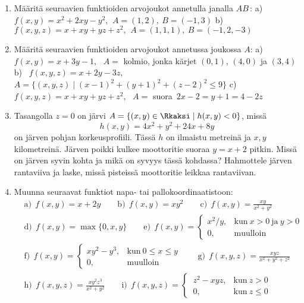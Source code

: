 \Harj
\begin{enumerate}

\item
Määritä seuraavien funktioiden arvojoukot annetulla janalla $AB$\,: \newline
a) \ $f(x,y)=x^2+2xy-y^2,\,\ A=(1,2),\ B=(-1,3)$ \newline
b) \ $f(x,y,z)=x+xy+yz+z^2,\,\ A=(1,1,1),\ B=(-1,2,-3)$

\item
Määritä seuraavien funktioiden arvojoukot annetussa joukossa $A$: \newline
a) \ $f(x,y)=x+3y-1$, \ $A=$ kolmio, jonka kärjet $(0,1)$, $(4,0)$ ja $(3,4)$ \newline
b) \ $f(x,y,z)=x+2y-3z$, \ $A=\{(x,y,z) \mid (x-1)^2+(y+1)^2+(z-2)^2 \le 9\}$ \newline
c) \ $f(x,y,z)=x+xy+yz+z^2$, \ $A=$ suora $\,2x-2=y+1=4-2z$

\item
Tasangolla $z=0$ on järvi $A=\{(x,y)\in\Rkaksi \mid h(x,y)<0\}$, missä
\[
h(x,y) = 4x^2+y^2+24x+8y
\]
on järven pohjan korkeusprofiili. Tässä $h$ on ilmaistu metreinä ja $x,y$ kilometreinä.
Järven poikki kulkee moottoritie suoraa $y=x+2$ pitkin. Missä on järven syvin kohta ja mikä
on syvyys tässä kohdassa? Hahmottele järven rantaviiva ja laske, missä pisteissä moottoritie
leikkaa rantaviivan.

\item
Muunna seuraavat funktiot napa- tai pallokoordinaatistoon:
\begin{align*}
&\text{a)}\ \ f(x,y)=x+2y \qquad \text{b)}\ \ f(x,y)=xy^2 \qquad 
 \text{c)}\ \ f(x,y)=\frac{xy}{x^2+y^2} \\
&\text{d)}\ \ f(x,y)=\max\{0,x,y\} \qquad
 \text{e)}\ \ f(x,y)=\begin{cases} x^2/y, &\text{kun}\ x > 0\ \text{ja}\ y>0 \\
                                   0,     &\text{muulloin}
                     \end{cases} \\
&\text{f)}\ \ f(x,y)=\begin{cases} xy^2-y^3, &\text{kun}\ 0 \le x \le y \\
                                   0,        &\text{muulloin}
                     \end{cases} \qquad
 \text{g)}\ \ f(x,y,z)=\frac{xyz}{x^2+y^2+z^2} \\
&\text{h)}\ \ f(x,y,z)=\frac{xy^2z^3}{x^2+y^2} \qquad 
 \text{i)}\ \ f(x,y,z)=\begin{cases}
                      \,z^2-xyz, &\text{kun}\ z>0 \\ \,0, &\text{kun}\ z \le 0
                      \end{cases}
\end{align*}


\end{enumerate}
